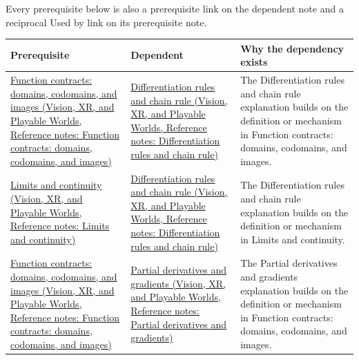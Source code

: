 Every prerequisite below is also a prerequisite link on the dependent note and a reciprocal Used by link on its prerequisite note.

{\def\LTcaptype{none} %
\begin{longtable}[]{@{}
  >{\raggedright\arraybackslash}p{}
  >{\raggedright\arraybackslash}p{}
  >{\raggedright\arraybackslash}p{}@{}}
\toprule\noalign{}
\begin{minipage}[b]{\linewidth}\raggedright
Prerequisite
\end{minipage} & \begin{minipage}[b]{\linewidth}\raggedright
Dependent
\end{minipage} & \begin{minipage}[b]{\linewidth}\raggedright
Why the dependency exists
\end{minipage} \\
\midrule\noalign{}
\endhead
\bottomrule\noalign{}
\endlastfoot
\href{../07-Vision-XR-and-Playable-Worlds/main.pdf\#nameddest=appendix-a59658325cd6}{Function contracts: domains, codomains, and images (Vision, XR, and Playable Worlds, Reference notes: Function contracts: domains, codomains, and images)} & \href{../07-Vision-XR-and-Playable-Worlds/main.pdf\#nameddest=appendix-d9f70bdfbc92}{Differentiation rules and chain rule (Vision, XR, and Playable Worlds, Reference notes: Differentiation rules and chain rule)} & The Differentiation rules and chain rule explanation builds on the definition or mechanism in Function contracts: domains, codomains, and images. \\
\href{../07-Vision-XR-and-Playable-Worlds/main.pdf\#nameddest=appendix-fecc1847f5a3}{Limits and continuity (Vision, XR, and Playable Worlds, Reference notes: Limits and continuity)} & \href{../07-Vision-XR-and-Playable-Worlds/main.pdf\#nameddest=appendix-d9f70bdfbc92}{Differentiation rules and chain rule (Vision, XR, and Playable Worlds, Reference notes: Differentiation rules and chain rule)} & The Differentiation rules and chain rule explanation builds on the definition or mechanism in Limits and continuity. \\
\href{../07-Vision-XR-and-Playable-Worlds/main.pdf\#nameddest=appendix-a59658325cd6}{Function contracts: domains, codomains, and images (Vision, XR, and Playable Worlds, Reference notes: Function contracts: domains, codomains, and images)} & \href{../07-Vision-XR-and-Playable-Worlds/main.pdf\#nameddest=appendix-677b59746ae0}{Partial derivatives and gradients (Vision, XR, and Playable Worlds, Reference notes: Partial derivatives and gradients)} & The Partial derivatives and gradients explanation builds on the definition or mechanism in Function contracts: domains, codomains, and images. \\

\end{longtable}}
